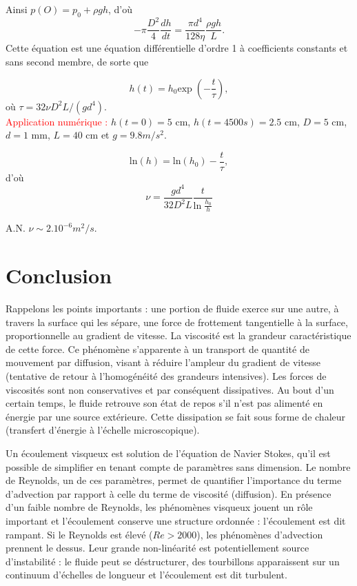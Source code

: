 \documentclass[11pt,a4paper]{report}
\begin{document}
Ainsi $p(O) = p_0 + \rho g h$, d'où
\begin{equation}
	-\pi\frac{D^2}{4}\frac{dh}{dt} = \frac{\pi d^4}{128\eta}\frac{\rho g h}{L}.
\end{equation}
Cette équation est une équation différentielle d'ordre 1 à coefficients constants et sans second membre, de sorte que

\begin{equation}
	h(t) = h_0 \text{exp}\;\left(-\frac{t}{\tau}\right),
\end{equation}
où $\tau = 32 \nu D^2 L/(g d^4)$.\\

\textcolor{red}{Application numérique :}
$h(t = 0) = 5$ cm, $h(t = 4500s) = 2.5$ cm, $D = 5$ cm, $d = 1$ mm, $L = 40$ cm et $g = 9.8 m/s^2$. 

\begin{equation}
	\text{ln}(h) = \text{ln}(h_0) - \frac{t}{\tau},
\end{equation} 
d'où
\begin{equation}
	\displaystyle{\nu = \frac{g d^4}{32D^2L}\frac{t}{\text{ln}\;\frac{h_0}{h}}}
\end{equation}

A.N. $\nu \sim 2.10^{-6} m^2/s$.

\section{Conclusion}

Rappelons les points importants : une portion de fluide exerce sur une autre, à travers la surface qui les sépare, une force de frottement tangentielle à la surface, proportionnelle au gradient de vitesse. La viscosité est la grandeur caractéristique de cette force. Ce phénomène s'apparente à un transport de quantité de mouvement par diffusion, visant à réduire l'ampleur du gradient de vitesse (tentative de retour à l'homogénéité des grandeurs intensives). Les forces de viscosités sont non conservatives et par conséquent dissipatives. Au bout d'un certain temps, le fluide retrouve son état de repos s'il n'est pas alimenté en énergie par une source extérieure. Cette dissipation se fait sous forme de chaleur (transfert d'énergie à l'échelle microscopique).

Un écoulement visqueux est solution de l'équation de Navier Stokes, qu'il est possible de simplifier en tenant compte de paramètres sans dimension. Le nombre de Reynolds, un de ces paramètres, permet de quantifier l'importance du terme d'advection par rapport à celle du terme de viscosité (diffusion). En présence d'un faible nombre de Reynolds, les phénomènes visqueux jouent un rôle important et l'écoulement conserve une structure ordonnée : l'écoulement est dit rampant. Si le Reynolds est élevé ($Re > 2000$), les phénomènes d'advection prennent le dessus. Leur grande non-linéarité est potentiellement source d'instabilité : le fluide peut se déstructurer, des tourbillons apparaissent sur un continuum d'échelles de longueur et l'écoulement est dit turbulent. 
\end{document}

